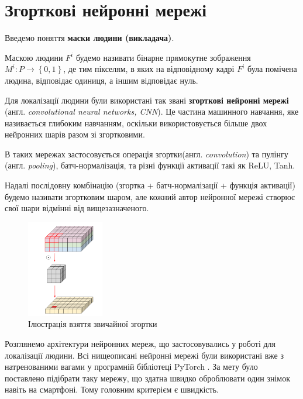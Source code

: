 \section{Згорткові нейронні мережі}

Введемо поняття \textbf{маски людини (викладача)}.

Маскою людини \(F^{i}\) будемо називати бінарне прямокутне
зображення \(M^{i}:P \rightarrow \left\{ 0,1 \right\}\), де тим
пікселям, в яких на відповідному кадрі \(F^{i}\) була помічена людина,
відповідає одиниця, а іншим відповідає нуль.


Для локалізації людини були використані так звані \textbf{згорткові нейронні мережі}
(англ. \textit{convolutional neural networks, CNN}).
Це частина машинного навчання, яке називається глибоким навчанням, оскільки використовується
більше двох нейронних шарів разом зі згортковими.

В таких мережах застосовується операція згортки(англ. \textit{convolution})
та пулінгу (англ. \textit{pooling}), батч-нормалізація, та різні функції
активації такі як ReLU, Tanh.

Надалі послідовну комбінацію (згортка + батч-нормалізації + функція активації)
будемо називати згортковим шаром, але кожний автор нейронної мережі
створює свої шари відмінні від вищезазначеного.

\begin{figure}[H]
    \centering
    \includegraphics[width=0.3\textwidth]{images/cnn_conv_operation}
    \caption{Ілюстрація взяття звичайної згортки  \cite{deep_wise_sep_conv_website}
        \label{fig:cnn:conv_operation}
    }
\end{figure}

Розглянемо архітектури нейронних мереж, що застосовувались у роботі
для локалізації людини. Всі нищеописані нейронні мережі були використані вже з
натренованими вагами у програмній бібліотеці PyTorch \cite{NEURIPS2019_9015}.
За мету було поставлено підібрати таку мережу, що здатна швидко оброблювати
один знімок навіть на смартфоні. Тому головним критерієм є швидкість.

